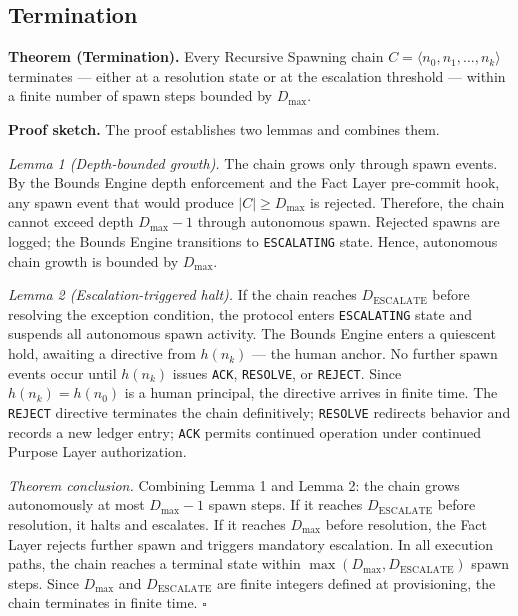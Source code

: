 \subsection{Termination}
\label{sec:rs-termination}

\textbf{Theorem (Termination).} Every Recursive Spawning chain $C = \langle n_0, n_1, \ldots, n_k \rangle$ terminates — either at a resolution state or at the escalation threshold — within a finite number of spawn steps bounded by $D_{\text{max}}$.

\medskip
\textbf{Proof sketch.} The proof establishes two lemmas and combines them.

\medskip
\textit{Lemma 1 (Depth-bounded growth).} The chain grows only through spawn events. By the Bounds Engine depth enforcement and the Fact Layer pre-commit hook, any spawn event that would produce $|C| \geq D_{\text{max}}$ is rejected. Therefore, the chain cannot exceed depth $D_{\text{max}} - 1$ through autonomous spawn. Rejected spawns are logged; the Bounds Engine transitions to \texttt{ESCALATING} state. Hence, autonomous chain growth is bounded by $D_{\text{max}}$.

\medskip
\textit{Lemma 2 (Escalation-triggered halt).} If the chain reaches $D_{\text{ESCALATE}}$ before resolving the exception condition, the protocol enters \texttt{ESCALATING} state and suspends all autonomous spawn activity. The Bounds Engine enters a quiescent hold, awaiting a directive from $h(n_k)$ — the human anchor. No further spawn events occur until $h(n_k)$ issues \texttt{ACK}, \texttt{RESOLVE}, or \texttt{REJECT}. Since $h(n_k) = h(n_0)$ is a human principal, the directive arrives in finite time. The \texttt{REJECT} directive terminates the chain definitively; \texttt{RESOLVE} redirects behavior and records a new ledger entry; \texttt{ACK} permits continued operation under continued Purpose Layer authorization.

\medskip
\textit{Theorem conclusion.} Combining Lemma 1 and Lemma 2: the chain grows autonomously at most $D_{\text{max}} - 1$ spawn steps. If it reaches $D_{\text{ESCALATE}}$ before resolution, it halts and escalates. If it reaches $D_{\text{max}}$ before resolution, the Fact Layer rejects further spawn and triggers mandatory escalation. In all execution paths, the chain reaches a terminal state within $\max(D_{\text{max}}, D_{\text{ESCALATE}})$ spawn steps. Since $D_{\text{max}}$ and $D_{\text{ESCALATE}}$ are finite integers defined at provisioning, the chain terminates in finite time. $\square$

